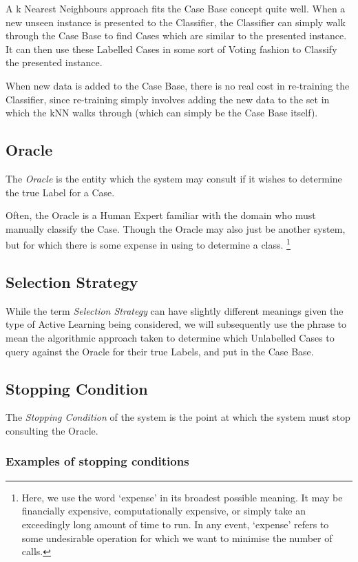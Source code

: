 \documentclass[a4paper,11pt]{report}
\begin{document}
A k Nearest Neighbours approach fits the Case Base concept quite well. When a new unseen instance is presented to the Classifier, the Classifier can simply walk through the Case Base to find Cases which are similar to the presented instance. It can then use these Labelled Cases in some sort of Voting fashion to Classify the presented instance.

When new data is added to the Case Base, there is no real cost in re-training the Classifier, since re-training simply involves adding the new data to the set in which the kNN walks through (which can simply be the Case Base itself).

\subsection{Oracle}
The \emph{Oracle} is the entity which the system may consult if it wishes to determine the true Label for a Case.

Often, the Oracle is a Human Expert familiar with the domain who must manually classify the Case. Though the Oracle may also just be another system, but for which there is some expense in using to determine a class. \footnote{Here, we use the word `expense' in its broadest possible meaning. It may be financially expensive, computationally expensive, or simply take an exceedingly long amount of time to run. In any event, `expense' refers to some undesirable operation for which we want to minimise the number of calls.}

\subsection{Selection Strategy}
While the term \emph{Selection Strategy} can have slightly different meanings given the type of Active Learning being considered, we will subsequently use the phrase to mean the algorithmic approach taken to determine which Unlabelled Cases to query against the Oracle for their true Labels, and put in the Case Base.

\subsection{Stopping Condition}
The \emph{Stopping Condition} of the system is the point at which the system must stop consulting the Oracle.

\subsubsection{Examples of stopping conditions}
\end{document}

